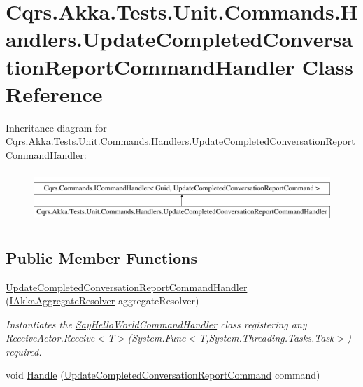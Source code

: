 \hypertarget{classCqrs_1_1Akka_1_1Tests_1_1Unit_1_1Commands_1_1Handlers_1_1UpdateCompletedConversationReportCommandHandler}{}\section{Cqrs.\+Akka.\+Tests.\+Unit.\+Commands.\+Handlers.\+Update\+Completed\+Conversation\+Report\+Command\+Handler Class Reference}
\label{classCqrs_1_1Akka_1_1Tests_1_1Unit_1_1Commands_1_1Handlers_1_1UpdateCompletedConversationReportCommandHandler}
Inheritance diagram for Cqrs.\+Akka.\+Tests.\+Unit.\+Commands.\+Handlers.\+Update\+Completed\+Conversation\+Report\+Command\+Handler\+:\begin{figure}[H]
\begin{center}
\leavevmode
\includegraphics[height=1.964912cm]{classCqrs_1_1Akka_1_1Tests_1_1Unit_1_1Commands_1_1Handlers_1_1UpdateCompletedConversationReportCommandHandler}
\end{center}
\end{figure}
\subsection*{Public Member Functions}
\begin{DoxyCompactItemize}
\item 
\hyperlink{classCqrs_1_1Akka_1_1Tests_1_1Unit_1_1Commands_1_1Handlers_1_1UpdateCompletedConversationReportCommandHandler_a816316549866b3e4abb410a7b9ea06a3}{Update\+Completed\+Conversation\+Report\+Command\+Handler} (\hyperlink{interfaceCqrs_1_1Akka_1_1Domain_1_1IAkkaAggregateResolver}{I\+Akka\+Aggregate\+Resolver} aggregate\+Resolver)
\begin{DoxyCompactList}\small\item\em Instantiates the \hyperlink{classCqrs_1_1Akka_1_1Tests_1_1Unit_1_1Commands_1_1Handlers_1_1SayHelloWorldCommandHandler}{Say\+Hello\+World\+Command\+Handler} class registering any Receive\+Actor.\+Receive$<$\+T$>$(\+System.\+Func$<$\+T,\+System.\+Threading.\+Tasks.\+Task$>$) required. \end{DoxyCompactList}\item 
void \hyperlink{classCqrs_1_1Akka_1_1Tests_1_1Unit_1_1Commands_1_1Handlers_1_1UpdateCompletedConversationReportCommandHandler_aecb596ab5c5e17823b93ac4fcae0e43e}{Handle} (\hyperlink{classCqrs_1_1Akka_1_1Tests_1_1Unit_1_1Commands_1_1UpdateCompletedConversationReportCommand}{Update\+Completed\+Conversation\+Report\+Command} command)
\end{DoxyCompactItemize}
